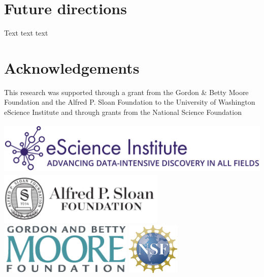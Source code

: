 \documentclass[a0,landscape]{a0poster}
\begin{document}
\begin{multicols}{3}
\section*{Future directions}

Text text text

\nocite{*} %

\section*{Acknowledgements}

This research was supported through a grant from the Gordon \& Betty Moore
Foundation and the Alfred P. Sloan Foundation to the University of Washington
eScience Institute and through grants from the National Science Foundation

\includegraphics[height=2.5cm]{eSciencelogo.png}
\includegraphics[height=2.5cm]{SloanLogo.png}
\includegraphics[height=2.5cm]{MooreFdn.png}
\includegraphics[height=2.5cm]{NSFLogo}

\end{multicols}
\end{document}
